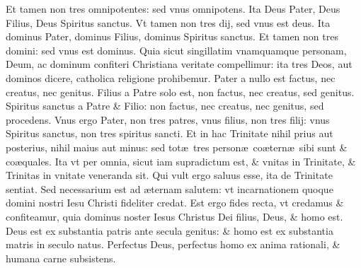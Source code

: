 \documentclass[a5paper,10pt]{book}
\def\ae{æ}
\begin{document}
\begin{multicols*}{2}
\newline \color{red} E\color{black}t tamen non tres omnipotentes: sed vnus omnipotens.
\newline \color{red} I\color{black}ta Deus Pater, Deus Filius, Deus Spiritus sanctus.
\newline \color{red} V\color{black}t tamen non tres dij, sed vnus est deus.
\newline \color{red} I\color{black}ta dominus Pater, dominus Filius, dominus Spiritus sanctus.
\newline \color{red} E\color{black}t tamen non tres domini: sed vnus est dominus.
\newline \color{red} Q\color{black}uia sicut singillatim vnamquamque personam, Deum, ac dominum confiteri Christiana veritate compellimur: ita tres Deos, aut dominos dicere, catholica religione prohibemur.%
\newline \color{red} P\color{black}ater a nullo est factus, nec creatus, nec genitus.
\newline \color{red} F\color{black}ilius a Patre solo est, non factus, nec creatus, sed genitus.
\newline \color{red} S\color{black}piritus sanctus a Patre \& Filio: non factus, nec creatus, nec genitus, sed procedens.
\newline \color{red} V\color{black}nus ergo Pater, non tres patres, vnus filius, non tres filij: vnus Spiritus sanctus, non tres spiritus sancti.
\newline \color{red} E\color{black}t in hac Trinitate nihil prius aut posterius, nihil maius aut minus: sed tot\ae \ tres person\ae \ co\ae tern\ae \ sibi sunt \& co\ae quales.
\newline \color{red} I\color{black}ta vt per omnia, sicut iam supradictum est, \& vnitas in Trinitate, \& Trinitas in vnitate veneranda sit.
\newline \color{red} Q\color{black}ui vult ergo saluus esse, ita de Trinitate sentiat.
\newline \color{red} S\color{black}ed necessarium est ad \ae ternam salutem: vt incarnationem quoque domini nostri Iesu Christi fideliter credat.
\newline \color{red} E\color{black}st ergo fides recta, vt credamus \& confiteamur, quia dominus noster Iesus Christus Dei filius, Deus, \& homo est.
\newline \color{red} D\color{black}eus est ex substantia patris ante secula genitus: \& homo est ex substantia matris in seculo natus.
\newline \color{red} P\color{black}erfectus Deus, perfectus homo ex anima rationali, \& humana carne subsistens.

\end{multicols*}
\end{document}
